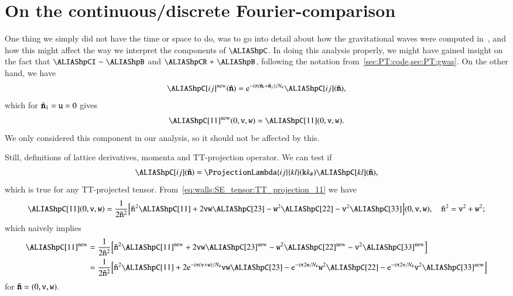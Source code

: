 \section{On the continuous/discrete Fourier-comparison}\label{app:misc:CFT_DFT}
    One thing we simply did not have the time or space to do, was to go into detail about how the gravitational waves were computed in~\asgrd, and how this might affect the way we interpret the components of $\hpC$. 
    In doing this analysis properly, we might have gained insight on the fact that $\hpCI \sim \hpB$ and $\hpCR \not\sim \hpB$, following the notation from~\cref{sec:PT:code,sec:PT:gwas}. On the other hand, we have~\citep{adamekGevolutionCosmologicalNbody2016}
    \begin{equation}
        \hpC[ij]\ap{new}(\lcoordk) = \eu[-\im \ppi (\lcoordk_i + \lcoordk_j)/N_\# ] \hpC[ij](\lcoordk),
    \end{equation}
    which for $\tilde{\boldsymbol{\mathtt{n}}}_1 =\mathtt{u}= 0$ gives 
    \begin{equation}
        \hpC[11]\ap{new}(0,\lcoord{v},\lcoord{w}) = \hpC[11](0,\lcoord{v},\lcoord{w}).
    \end{equation}
    We only considered this component in our analysis, so it should not be affected by this.

    Still, definitions of lattice derivatives, momenta and TT-projection operator. We can test if
    \begin{equation}
        \hpC[ij](\lcoordk) =  \ProjectionLambda{ij}{kl}(\lcoord{k}k_\#) \hpC[kl](\lcoordk),
    \end{equation}
    which is true for any TT-projected tensor. From~\cref{eq:walls:SE_tensor:TT_projection_11} we have
    \begin{equation}
        \hpC[11](0,\lcoord{v},\lcoord{w}) = \frac{1}{2\tilde{\lcoord{n}}^2}  \bclosed{\tilde{\lcoord{n}}^2 \hpC[11] + 2 \lcoord{v}\lcoord{w}\hpC[23] - \lcoord{w}^2 \hpC[22] - \lcoord{v}^2 \hpC[33]  }(0,\lcoord{v},\lcoord{w}) , \quad \tilde{\lcoord{n}}^2 = \lcoord{v}^2 + \lcoord{w}^2;
    \end{equation}
    which naively implies
    \begin{align}
        \hpC[11]\ap{new}&= \frac{1}{2\tilde{\lcoord{n}}^2}  \bclosed{\tilde{\lcoord{n}}^2 \hpC[11]\ap{new} + 2 \lcoord{v}\lcoord{w}\hpC[23]\ap{new} - \lcoord{w}^2 \hpC[22]\ap{new} - \lcoord{v}^2 \hpC[33]\ap{new}  }\nonumber \\
        & = \frac{1}{2\tilde{\lcoord{n}}^2} \bclosed{\tilde{\lcoord{n}}^2 \hpC[11]+ 2 \eu[-\im \ppi (\lcoord{v}+\lcoord{w})/N_\#] \lcoord{v}\lcoord{w}\hpC[23] - \eu[-\im \ppi 2\lcoord{w}/N_\#] \lcoord{w}^2 \hpC[22] - \eu[-\im \ppi 2\lcoord{v}/N_\#]\lcoord{v}^2 \hpC[33]\ap{new}  }
    \end{align}
    for $\tilde{\boldsymbol{\mathtt{n}}} = (0,\mathtt{v},\mathtt{w})$. 
    
